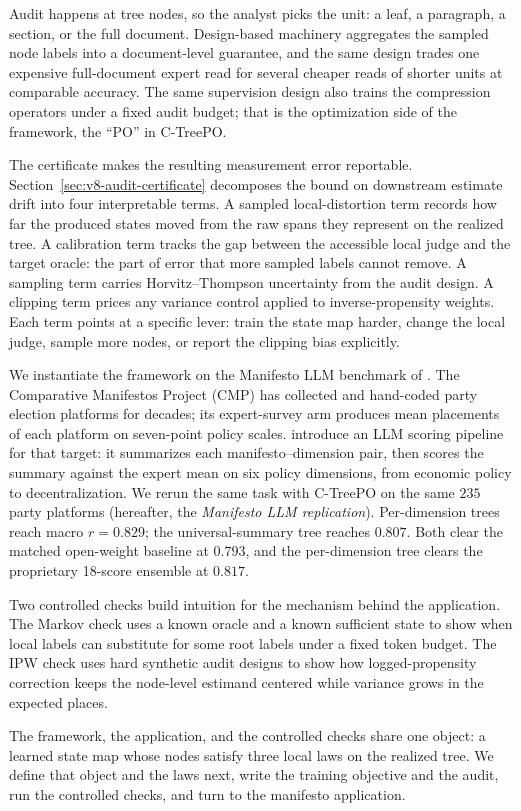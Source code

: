 Audit happens at tree nodes, so the analyst picks the unit: a leaf,
a paragraph, a section, or the full document. Design-based
machinery aggregates the sampled node labels into a document-level
guarantee, and the same design trades one expensive full-document
expert read for several cheaper reads of shorter units at
comparable accuracy. The same supervision design also trains the
compression operators under a fixed audit budget; that is the
optimization side of the framework, the ``PO'' in C-TreePO.

The certificate makes the resulting measurement error reportable.
Section~\ref{sec:v8-audit-certificate} decomposes the bound on
downstream estimate drift into four interpretable terms. A sampled
local-distortion term records how far the produced states moved
from the raw spans they represent on the realized tree. A
calibration term tracks the gap between the accessible local judge
and the target oracle: the part of error that more sampled labels
cannot remove. A sampling term carries Horvitz--Thompson uncertainty
from the audit design. A clipping term prices any variance control
applied to inverse-propensity weights. Each term points at a
specific lever: train the state map harder, change the local judge,
sample more nodes, or report the clipping bias explicitly.

We instantiate the framework on the Manifesto LLM benchmark of
\citet{BenoitEtAl2025}. The Comparative Manifestos Project (CMP)
has collected and hand-coded party election platforms for decades;
its expert-survey arm produces mean placements of each platform on
seven-point policy scales. \citet{BenoitEtAl2025} introduce an LLM
scoring pipeline for that target: it summarizes each
manifesto--dimension pair, then scores the summary against the
expert mean on six policy dimensions, from economic policy to
decentralization. We rerun the same task with C-TreePO on the same
\(235\) party platforms (hereafter, the \emph{Manifesto LLM
replication}).
Per-dimension trees reach macro \(r=0.829\); the universal-summary
tree reaches \(0.807\). Both clear the matched open-weight baseline
at \(0.793\), and the per-dimension tree clears the proprietary
18-score ensemble at \(0.817\).

Two controlled checks build intuition for the mechanism behind the
application. The Markov check uses a known oracle and a known
sufficient state to show when local labels can substitute for some
root labels under a fixed token budget. The IPW check uses hard
synthetic audit designs to show how logged-propensity correction
keeps the node-level estimand centered while variance grows in the
expected places.

The framework, the application, and the controlled checks share one
object: a learned state map whose nodes satisfy three local laws on
the realized tree. We define that object and the laws next, write
the training objective and the audit, run the controlled checks,
and turn to the manifesto application.
